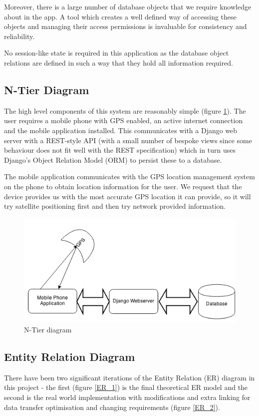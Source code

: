 Moreover, there is a large number of database objects that we require
knowledge about in the app. A tool which creates a well defined way of
accessing these objects and managing their access permissions is
invaluable for consistency and reliability.

No session-like state is required in this application as the database
object relations are defined in such a way that they hold all
information required. 

\subsection{N-Tier Diagram}
The high level components of this system are reasonably simple (figure
\ref{NTier}). The
user requires a mobile phone with GPS enabled, an active internet
connection and the mobile application installed. This communicates
with a Django web server with a REST-style API (with a small number of
bespoke views since some behaviour does not fit well with the REST
specification) which in turn uses Django's Object Relation Model (ORM)
to persist these to a database.

The mobile application communicates with the GPS location
management system on the phone to obtain location information for the
user. We request that the device provides us with the most
accurate GPS location it can provide, so it will try satellite
positioning first and then try network provided information.
\begin{figure}[H]
  \centering
  \includegraphics[width=\textwidth]{images/N-tier.png}
  \caption{N-Tier diagram}
  \label{NTier}
\end{figure}

\subsection{Entity Relation Diagram}
\label{sec:ER}
There have been two significant iterations of the Entity Relation (ER)
diagram in this project - the first (figure \ref{ER_1}) is the final
theoretical ER model and the second is the real world implementation
with modifications and extra linking for data transfer optimisation
and changing requirements (figure \ref{ER_2}).


